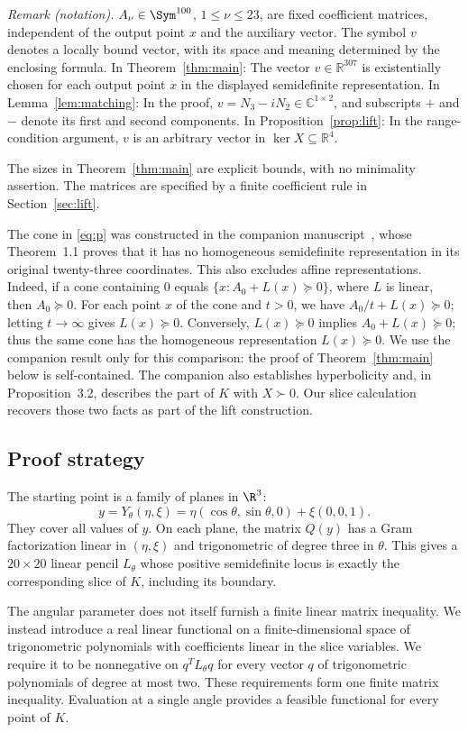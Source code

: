 \noindent\textit{Remark (notation).} $A_\nu\in\Sym^{100}$, $1\leq\nu\leq23$, are fixed coefficient matrices, independent of the output point $x$ and the auxiliary vector. The symbol $v$ denotes a locally bound vector, with its space and meaning determined by the enclosing formula. In Theorem~\ref{thm:main}: The vector $v\in\mathbb R^{307}$ is existentially chosen for each output point $x$ in the displayed semidefinite representation. In Lemma~\ref{lem:matching}: In the proof, $v=N_3-iN_2\in\mathbb C^{1\times2}$, and subscripts $+$ and $-$ denote its first and second components. In Proposition~\ref{prop:lift}: In the range-condition argument, $v$ is an arbitrary vector in $\ker X\subseteq\mathbb R^4$.


The sizes in Theorem~\ref{thm:main} are explicit bounds, with no
minimality assertion. The matrices are specified by a finite
coefficient rule in Section~\ref{sec:lift}.

The cone in \eqref{eq:p} was constructed in the companion
manuscript~\cite{parent}, whose Theorem~1.1 proves that it has no
homogeneous semidefinite representation in its original twenty-three
coordinates. This also excludes affine representations. Indeed, if a
cone containing $0$ equals $\{x:A_0+L(x)\succeq0\}$, where $L$ is
linear, then $A_0\succeq0$. For each point $x$ of the cone and $t>0$,
we have $A_0/t+L(x)\succeq0$; letting $t\to\infty$ gives $L(x)\succeq0$.
Conversely, $L(x)\succeq0$ implies $A_0+L(x)\succeq0$; thus the same
cone has the homogeneous representation $L(x)\succeq0$.
We use the companion result only for this comparison: the proof of
Theorem~\ref{thm:main} below is self-contained. The companion also
establishes hyperbolicity and, in Proposition~3.2, describes the part of
$K$ with $X\succ0$. Our slice calculation recovers those two facts as
part of the lift construction.

\subsection{Proof strategy}
The starting point is a family of planes in $\R^3$:
\[
 y=Y_\theta(\eta,\xi)
   =\eta(\cos\theta,\sin\theta,0)+\xi(0,0,1).
\]
They cover all values of $y$. On each plane, the matrix $Q(y)$ has a
Gram factorization linear in $(\eta,\xi)$ and trigonometric of degree
three in $\theta$. This gives a $20\times20$ linear pencil $L_\theta$
whose positive semidefinite locus is exactly the corresponding slice
of $K$, including its boundary.

The angular parameter does not itself furnish a finite linear matrix
inequality. We instead introduce a real linear functional on a
finite-dimensional space of trigonometric polynomials with coefficients
linear in the slice variables. We require it to be nonnegative on
$q^TL_\theta q$ for every vector $q$ of trigonometric polynomials of
degree at most two. These requirements form one finite matrix
inequality. Evaluation at a single angle provides a feasible functional
for every point of $K$.

